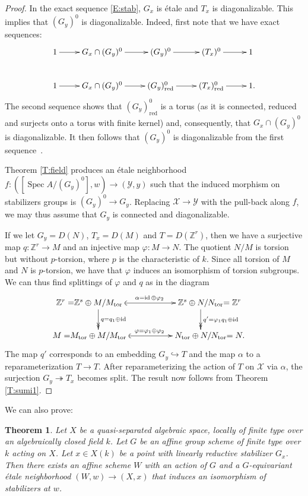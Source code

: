 \documentclass[a4paper]{amsart}
\theoremstyle{plain}
\newtheorem{theorem}{Theorem}[section]
\theoremstyle{definition}
\theoremstyle{remark}
\numberwithin{equation}{section}
\newcommand{\inj}{\hookrightarrow} %
\newcommand{\surj}{\twoheadrightarrow} %
\newcommand{\red}{\mathrm{red}}
\newcommand\ZZ{\mathbb{Z}}
\newcommand\cX{\mathcal{X}}
\newcommand\cY{\mathcal{Y}}
\DeclareMathOperator{\Spec}{Spec}
\DeclareMathOperator{\id}{id}
\begin{document}
\begin{proof}%
In the exact sequence \eqref{E:stab}, $G_x$ is \'etale and $T_x$ is diagonalizable. This implies that
$(G_y)^0$ is diagonalizable. Indeed, first note that we have exact sequences:
\[
\xymatrix{1 \ar[r] & G_x\cap (G_y)^0 \ar[r] & (G_y)^0 \ar[r] & (T_x)^0 \ar[r] & 1\phantom{.}\\
1 \ar[r] & G_x\cap (G_y)^0 \ar[r] & (G_y)^0_\red \ar[r] & (T_x)^0_\red \ar[r] & 1.}
\]
The second sequence shows that $(G_y)^0_\red$ is a torus 
(as it is connected, reduced and surjects onto a torus with finite kernel) and, consequently,
that $G_x\cap (G_y)^0$ is diagonalizable. It then follows that $(G_y)^0$ is
diagonalizable from the first sequence~\cite[Exp.~XVII, Prop.~7.1.1~b)]{sga3ii}.

Theorem \ref{T:field} produces an \'etale neighborhood $f\colon ([\Spec
  A/(G_y)^0],w) \to (\cY,y)$ such that the induced morphism on stabilizers
groups is $(G_y)^0 \to G_y$. Replacing $\cX\to \cY$ with the pull-back along $f$,
we may thus assume that $G_y$ is connected and diagonalizable.

\newcommand{\tor}{\mathrm{tor}}%
If we let $G_y=D(N)$, $T_x=D(M)$ and $T=D(\ZZ^r)$, then we have a surjective
map $q\colon \ZZ^r\to M$ and an injective map $\varphi\colon M\to N$. The
quotient $N/M$ is torsion but without $p$-torsion, where $p$ is the
characteristic of $k$. Since all torsion of $M$ and $N$ is $p$-torsion, we
have that $\varphi$ induces an isomorphism of torsion subgroups. We can thus
find splittings of $\varphi$ and $q$ as in the diagram
\[
\xymatrix@C+10mm{
\mathllap{\ZZ^r=}\ZZ^s\oplus M/M_\tor\ar@{(->}[r]^{\alpha=\id\oplus\varphi_2}\ar@{->>}[d]^{q=q_1\oplus\id}
  & \ZZ^s\oplus N/N_\tor\mathrlap{=\ZZ^r}\ar@{->>}[d]^{q'=\varphi_1 q_1\oplus\id} \\
\mathllap{M=}M_\tor\oplus M/M_\tor\ar@{(->}[r]^{\varphi=\varphi_1\oplus \varphi_2}
  & N_\tor\oplus N/N_\tor\mathrlap{=N.}
}
\]
The map $q'$ corresponds to an embedding $G_y\inj T$ and the map
$\alpha$ to a reparameterization $T\to T$. After reparameterizing the
action of $T$ on $\cX$ via $\alpha$, the surjection $G_y\surj T_x$
becomes split. The result now follows from Theorem \ref{T:sumi1}.
\end{proof}

 We can also prove:

\begin{theorem} \label{T:sumi3}
Let $X$ be a quasi-separated algebraic space, locally of finite type over an algebraically closed field $k$. Let $G$ be an affine group scheme of finite type over $k$ acting on $X$.  Let $x \in X(k)$ be a point with linearly reductive stabilizer $G_x$.  Then there exists an affine scheme $W$ with an action of $G$ and a $G$-equivariant \'etale neighborhood $(W,w) \to (X,x)$ that induces an isomorphism of stabilizers at $w$.
\end{theorem}
\end{document}
